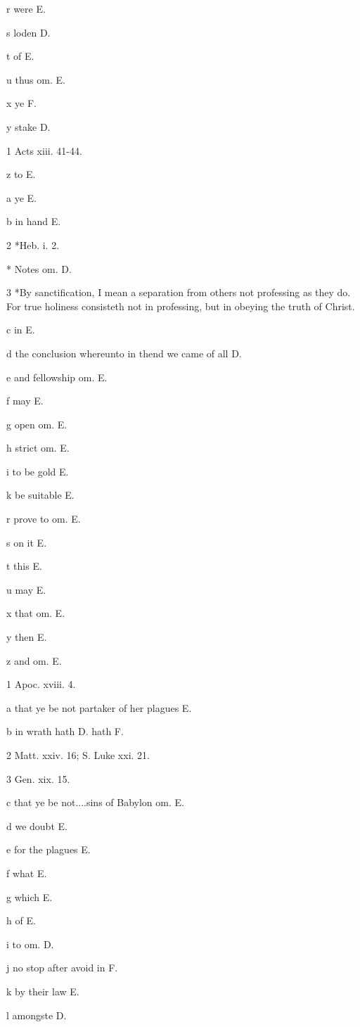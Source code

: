 r
were E.

s
loden D.

t
of E.

u
thus om. E.

x
ye F.

y
stake D.

1
Acts xiii. 41-44.

z
to E.

a
ye E.

b
in hand E.

2
*Heb. i. 2.

*
Notes om. D.

3
*By sanctification, I mean a separation from others not professing as they do. For true holiness consisteth not in professing, but in obeying the truth of Christ.

c
in E.

d
the conclusion whereunto in thend we came of all D.

e
and fellowship om. E.

f
may E.

g
open om. E.

h
strict om. E.

i
to be gold E.

k
be suitable E.

r
prove to om. E.

s
on it E.

t
this E.

u
may E.

x
that om. E.

y
then E.

z
and om. E.

1
Apoc. xviii. 4.

a
that ye be not partaker of her plagues E.

b
in wrath hath D. hath F.

2
Matt. xxiv. 16; S. Luke xxi. 21.

3
Gen. xix. 15.

c
that ye be not....sins of Babylon om. E.

d
we doubt E.

e
for the plagues E.

f
what E.

g
which E.

h
of E.

i
to om. D.

j
no stop after avoid in F.

k
by their law E.

l
amongste D.

